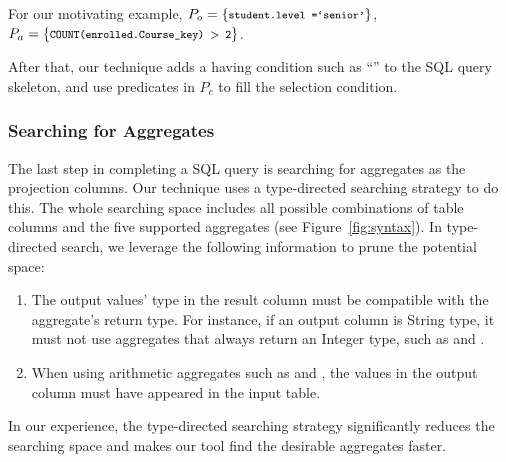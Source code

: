 For our motivating example,
$P_o = \{\CodeIn{student.level =`senior'}\}$, 
$P_a = \{\CodeIn{COUNT(enrolled.Course\_key) $>$ 2}\}$.

After that, our technique adds a having condition such as ``''
to the SQL query skeleton, and use predicates in $P_c$  to fill the selection condition.


\subsubsection{Searching for Aggregates}
\label{sec:agg_search}

The last step in completing a SQL query is searching for aggregates as the projection
columns. Our technique uses a type-directed searching strategy to do this. The whole
searching space includes all possible combinations of table columns and the five supported
aggregates (see Figure~\ref{fig:syntax}). In type-directed search, we leverage the following
information to prune the potential space:

\begin{enumerate}
\item The output values' type in the result column must be compatible with the aggregate's return
type. For instance, if an output column is String type, it must not use aggregates that always
return an Integer type, such as  and .

\item When using arithmetic aggregates such as  and , the values
in the output column must have appeared in the input table.
\end{enumerate}

In our experience, the type-directed searching strategy significantly reduces the
searching space and makes our tool find the desirable aggregates faster.
